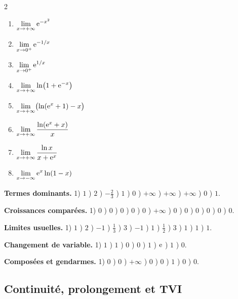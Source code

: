 \begin{multicols}{2}
\begin{enumerate}
	\item $\displaystyle\lim_{x\to+\infty}\mathrm{e}^{-x^2}$
	\item $\displaystyle\lim_{x\to 0^+}\mathrm{e}^{-1/x}$
	\item $\displaystyle\lim_{x\to 0^+}\mathrm{e}^{1/x}$
	\item $\displaystyle\lim_{x\to+\infty}\ln\bigl(1+\mathrm{e}^{-x}\bigr)$
	\item $\displaystyle\lim_{x\to+\infty}\bigl(\ln(\mathrm{e}^x+1)-x\bigr)$
	\item $\displaystyle\lim_{x\to+\infty}\frac{\ln(\mathrm{e}^x+x)}{x}$
	\item $\displaystyle\lim_{x\to+\infty}\frac{\ln x}{x+\mathrm{e}^x}$
	\item $\displaystyle\lim_{x\to-\infty}\mathrm{e}^{x}\ln(1-x)$
\end{enumerate}
\end{multicols}

\medskip
\begin{tcolorbox}[enhanced,breakable,colback=gray!5,colframe=black!55,
	boxrule=0.4pt,arc=1mm,left=3mm,right=3mm,top=2mm,bottom=2mm,
	fonttitle=\bfseries\sffamily,title={Réponses}]
{\footnotesize
\textbf{Termes dominants.}
1) $1$ ) $2$ ) $-\tfrac{2}{3}$ ) $1$ ) $0$ ) $+\infty$ ) $+\infty$ ) $+\infty$ ) $0$ ) $1$.

\smallskip
\textbf{Croissances comparées.}
1) $0$ ) $0$ ) $0$ ) $0$ ) $0$ ) $+\infty$ ) $0$ ) $0$ ) $0$ ) $0$ ) $0$ ) $0$.

\smallskip
\textbf{Limites usuelles.}
1) $1$ ) $2$ ) $-1$ ) $\tfrac{1}{3}$ ) $3$ ) $-1$ ) $1$ ) $\tfrac{1}{2}$ ) $3$ ) $1$ ) $1$ ) $1$.

\smallskip
\textbf{Changement de variable.}
1) $1$ ) $1$ ) $0$ ) $0$ ) $1$ ) $\mathrm{e}$ ) $1$ ) $0$.

\smallskip
\textbf{Composées et gendarmes.}
1) $0$ ) $0$ ) $+\infty$ ) $0$ ) $0$ ) $1$ ) $0$ ) $0$.
}
\end{tcolorbox}

\subsection{Continuité, prolongement et TVI}


